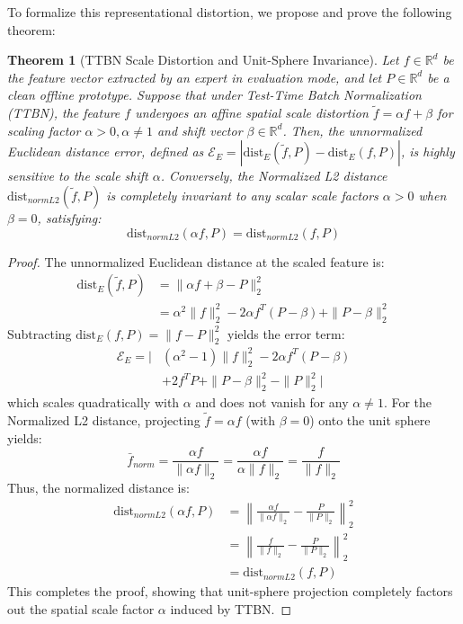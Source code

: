 \documentclass{article}
\theoremstyle{plain}
\newtheorem{theorem}{Theorem}[section]
\theoremstyle{definition}
\theoremstyle{remark}
\begin{document}
To formalize this representational distortion, we propose and prove the following theorem:

\begin{theorem}[TTBN Scale Distortion and Unit-Sphere Invariance]
Let $f \in \mathbb{R}^d$ be the feature vector extracted by an expert in evaluation mode, and let $P \in \mathbb{R}^d$ be a clean offline prototype. Suppose that under Test-Time Batch Normalization (TTBN), the feature $f$ undergoes an affine spatial scale distortion $\tilde{f} = \alpha f + \beta$ for scaling factor $\alpha > 0, \alpha \neq 1$ and shift vector $\beta \in \mathbb{R}^d$. 
Then, the unnormalized Euclidean distance error, defined as $\mathcal{E}_E = \left| \text{dist}_E(\tilde{f}, P) - \text{dist}_E(f, P) \right|$, is highly sensitive to the scale shift $\alpha$. Conversely, the Normalized L2 distance $\text{dist}_{normL2}(\tilde{f}, P)$ is completely invariant to any scalar scale factors $\alpha > 0$ when $\beta = 0$, satisfying:
\begin{equation}
    \text{dist}_{normL2}(\alpha f, P) = \text{dist}_{normL2}(f, P)
\end{equation}
\end{theorem}

\begin{proof}
The unnormalized Euclidean distance at the scaled feature is:
\begin{align*}
\text{dist}_E(\tilde{f}, P) &= \|\alpha f + \beta - P\|_2^2 \\
&= \alpha^2 \|f\|_2^2 - 2\alpha f^T(P - \beta) + \|P - \beta\|_2^2
\end{align*}
Subtracting $\text{dist}_E(f, P) = \|f - P\|_2^2$ yields the error term:
\begin{align*}
\mathcal{E}_E = \Big| &(\alpha^2 - 1)\|f\|_2^2 - 2\alpha f^T(P - \beta) \\
&+ 2 f^T P + \|P - \beta\|_2^2 - \|P\|_2^2 \Big|
\end{align*}
which scales quadratically with $\alpha$ and does not vanish for any $\alpha \neq 1$.
For the Normalized L2 distance, projecting $\tilde{f} = \alpha f$ (with $\beta = 0$) onto the unit sphere yields:
\begin{equation}
\bar{f}_{norm} = \frac{\alpha f}{\|\alpha f\|_2} = \frac{\alpha f}{\alpha \|f\|_2} = \frac{f}{\|f\|_2}
\end{equation}
Thus, the normalized distance is:
\begin{align*}
\text{dist}_{normL2}(\alpha f, P) &= \left\| \frac{\alpha f}{\|\alpha f\|_2} - \frac{P}{\|P\|_2} \right\|_2^2 \\
&= \left\| \frac{f}{\|f\|_2} - \frac{P}{\|P\|_2} \right\|_2^2 \\
&= \text{dist}_{normL2}(f, P)
\end{align*}
This completes the proof, showing that unit-sphere projection completely factors out the spatial scale factor $\alpha$ induced by TTBN.
\end{proof}
\end{document}
